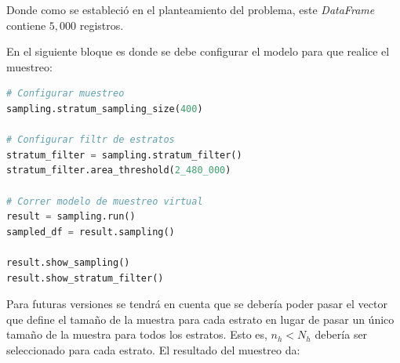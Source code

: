 Donde como se estableció en el planteamiento del problema, este \textit{DataFrame} contiene $5,000$ registros.

\bigbreak

En el siguiente bloque es donde se debe configurar el modelo para que realice el muestreo:

\bigbreak

\begin{lstlisting}[language=Python, caption=Configurar el muestreo virtual]
# Configurar muestreo
sampling.stratum_sampling_size(400)

# Configurar filtr de estratos
stratum_filter = sampling.stratum_filter()
stratum_filter.area_threshold(2_480_000)

# Correr modelo de muestreo virtual
result = sampling.run()
sampled_df = result.sampling()

result.show_sampling()
result.show_stratum_filter()
\end{lstlisting}

\bigbreak

Para futuras versiones se tendrá en cuenta que se debería poder pasar el vector que define el tamaño de la muestra para cada estrato en lugar de pasar un único tamaño de la muestra para todos los estratos. Esto es, $n_h < N_h$ debería ser seleccionado para cada estrato. El resultado del muestreo da:

